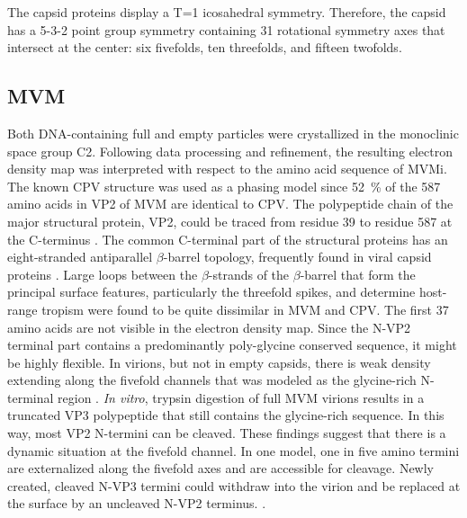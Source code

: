 The capsid proteins display a T=1 icosahedral symmetry. Therefore, the capsid has a 5-3-2 point group symmetry containing 31 rotational symmetry axes that intersect at the center: six fivefolds, ten threefolds, and fifteen twofolds. 











\subsection{MVM}

Both DNA-containing full and empty particles were crystallized in the monoclinic space group C2. Following data processing and refinement, the resulting electron density map was interpreted with respect to the amino acid sequence of MVMi. The known CPV structure was used as a phasing model since 52~\% of the 587 amino acids in VP2 of MVM are identical to CPV. The polypeptide chain of the major structural protein, VP2, could be traced from residue 39 to residue 587 at the C-terminus \cite{pmid15299974}.     
The common C-terminal part of the structural proteins has an eight-stranded antiparallel $\beta$-barrel topology, frequently found in viral capsid proteins \cite{pmid2673017}. Large loops between the $\beta$-strands of the $\beta$-barrel that form the principal surface features, particularly the threefold spikes, and determine host-range tropism were found to be quite dissimilar in MVM and CPV. 
The first 37 amino acids are not visible in the electron density map. Since the N-VP2 terminal part contains a predominantly poly-glycine conserved sequence, it might be highly flexible. In virions, but not in empty capsids, there is weak density extending along the fivefold channels that was modeled as the glycine-rich N-terminal region \cite{pmid15299494, pmid8969301}. \textit{In vitro}, trypsin digestion of full MVM virions results in a truncated VP3 polypeptide that still contains the glycine-rich sequence. In this way, most VP2 N-termini can be cleaved. These findings suggest that there is a dynamic situation at the fivefold channel. In one model, one in five amino termini are externalized along the fivefold axes and are accessible for cleavage. Newly created, cleaved N-VP3 termini could withdraw into the virion and be replaced at the surface by an uncleaved N-VP2 terminus. \cite{pmid8503170, pmid9817841}.
